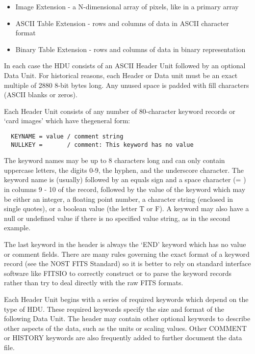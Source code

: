 \documentclass[11pt]{book}
\begin{document}
\begin{itemize}
\item
  Image Extension - a N-dimensional array of pixels, like in a primary array
\item
  ASCII Table Extension - rows and columns of data in ASCII character format
\item
  Binary Table Extension - rows and columns of data in binary representation
\end{itemize}

In each case the HDU consists of an ASCII Header Unit followed by an optional
Data Unit.  For historical reasons, each Header or Data unit must be an
exact multiple of 2880 8-bit bytes long.  Any unused space is padded
with fill characters (ASCII blanks or zeros).

Each Header Unit consists of any number of 80-character keyword records
or `card images' which have thegeneral form:

\begin{verbatim}
  KEYNAME = value / comment string
  NULLKEY =       / comment: This keyword has no value
\end{verbatim}
The keyword names may be up to 8 characters long and can only contain
uppercase letters, the digits 0-9, the hyphen, and the underscore
character. The keyword name is (usually) followed by an equals sign and
a space character (= ) in columns 9 - 10 of the record, followed by the
value of the keyword which may be either an integer, a floating point
number, a character string (enclosed in single quotes), or a boolean
value (the letter T or F).   A keyword may also have a null or undefined
value if there is no specified value string, as in the second example.

The last keyword in the header is always the `END' keyword which has no
value or comment fields. There are many rules governing the exact
format of a keyword record (see the NOST FITS Standard) so it is better
to rely on standard interface software like FITSIO to correctly
construct or to parse the keyword records rather than try to deal
directly with the raw FITS formats.

Each Header Unit begins with a series of required keywords which depend
on the type of HDU.  These required keywords specify the size and
format of the following Data Unit.  The header may contain other
optional keywords to describe other aspects of the data, such as the
units or scaling values.  Other COMMENT or HISTORY keywords are also
frequently added to further document the data file.
\end{document}
